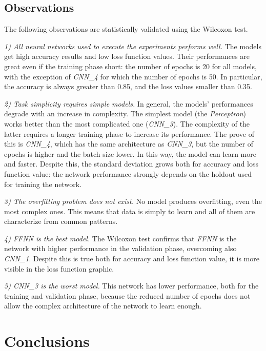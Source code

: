 \subsection{Observations}\label{header-n627}

The following observations are statistically validated using the
Wilcoxon test.

\emph{1) All neural networks used to execute the experiments performs
well.} The models get high accuracy results and low loss function
values. Their performances are great even if the training phase short:
the number of epochs is 20 for all models, with the exception of
\emph{CNN\_4} for which the number of epochs is 50. In particular, the
accuracy is always greater than 0.85, and the loss values smaller than
0.35.

\emph{2) Task simplicity requires simple models.} In general, the
models' performances degrade with an increase in complexity. The
simplest model (the \emph{Perceptron}) works better than the most
complicated one (\emph{CNN\_3}). The complexity of the latter requires a
longer training phase to increase its performance. The prove of this is
\emph{CNN\_4}, which has the same architecture as \emph{CNN\_3}, but the
number of epochs is higher and the batch size lower. In this way, the
model can learn more and faster. Despite this, the standard deviation
grows both for accuracy and loss function value: the network performance
strongly depends on the holdout used for training the network.

\emph{3) The overfitting problem does not exist.} No model produces
overfitting, even the most complex ones. This means that data is simply
to learn and all of them are characterize from common patterns.

\emph{4) FFNN is the best model.} The Wilcoxon test confirms that
\emph{FFNN} is the network with higher performance in the validation
phase, overcoming also \emph{CNN\_1}. Despite this is true both for
accuracy and loss function value, it is more visible in the loss
function graphic.

\emph{5) CNN\_3 is the worst model.} This network has lower performance,
both for the training and validation phase, because the reduced number
of epochs does not allow the complex architecture of the network to
learn enough.

\section{Conclusions}\label{header-n631}


